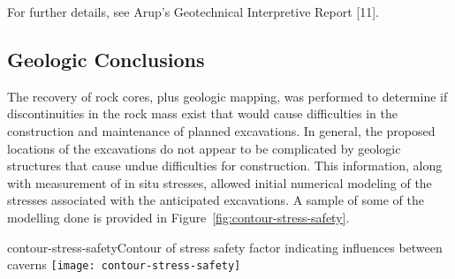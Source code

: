 For further details, see Arup's Geotechnical Interpretive Report [11]. 

\subsection{Geologic Conclusions}
\label{sec:fscf-site-cond-geo-concl}

The recovery of rock cores, plus geologic mapping, was performed to determine if discontinuities in the rock mass exist that would cause difficulties in the construction and maintenance of planned excavations. In general, the proposed locations of the excavations do not appear to be complicated by geologic structures that cause undue difficulties for construction. This information, along with measurement of in situ stresses, allowed initial numerical modeling of the stresses associated with the anticipated excavations. A sample of some of the modelling done is provided in Figure~\ref{fig:contour-stress-safety}.

\begin{cdrfigure}{contour-stress-safety}{Contour of stress safety factor indicating influences between caverns}
\texttt{[image: contour-stress-safety]}
\end{cdrfigure}


